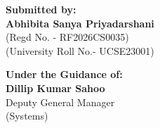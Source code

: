 \begin{titlepage}
\begin{center}
    \begin{minipage}[t]{0.48\textwidth}
        \begin{flushleft}
            {\normalsize \textbf{Submitted by:}}\\[0.2cm]
            {\small \textbf{Abhibita Sanya Priyadarshani} \\(Regd No. - RF2026CS0035) \\(University Roll No.- UCSE23001)}
        \end{flushleft}
    \end{minipage}
    \hfill
    \begin{minipage}[t]{0.45\textwidth}
        \begin{flushright}
            {\normalsize \textbf{Under the Guidance of:}}\\[0.2cm]
            {\small \textbf{Dillip Kumar Sahoo}}\\
            {\small Deputy General Manager\\(Systems)}
        \end{flushright}
    \end{minipage}

    

\end{center}
\end{titlepage}
